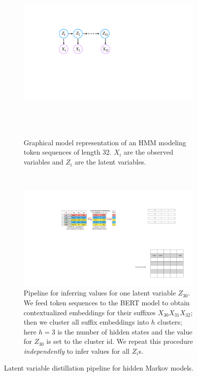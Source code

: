 \documentclass{article} %
\begin{document}
\begin{figure}
     \centering
     \begin{subfigure}[b]{0.27\textwidth}
         \centering
         \includegraphics[width=\textwidth]{figures/hmm.pdf}
         \hfill\\
         \hfill\\
         \hfill\\
         \hfill\\
         \caption{Graphical model representation of an HMM modeling token sequences of length 32. $X_{i}$ are the observed variables and $Z_{i}$ are the latent variables.}
         \label{fig:hmm}
     \end{subfigure}
     ~\hfill
     \begin{subfigure}[b]{0.68\textwidth}
         \centering
         \includegraphics[width=\textwidth]{figures/hmm-warmup.pdf}
         \caption{Pipeline for inferring values for one latent variable $Z_{30}$. We feed token sequences to the BERT model to obtain contextualized embeddings for their suffixes $X_{30}X_{31}X_{32}$; then we cluster all suffix embeddings into $h$ clusters; here $h = 3$ is the number of hidden states and the value for $Z_{30}$ is set to the cluster id. We repeat this procedure \emph{independently} to infer values for all $Z_i$s.}
         \label{fig:hmm-warmup-pipeline}
     \end{subfigure}
        \caption{Latent variable distillation pipeline for hidden Markov models.}
        \label{fig:hmm-warmup}
\end{figure}
\end{document}
